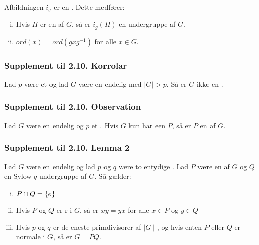 Afbildningen $i_g$ er en . Dette medfører:
\begin{enumerate}[(i)]
  \item Hvis $H$ er en  af $G$, så er $i_g (H)$ en
  undergruppe af $G$.
  \item $ord(x) = ord(gxg^{-1})$ for alle $x \in G$.
\end{enumerate}

\subsubsection{Supplement til 2.10. Korrolar}
Lad $p$ være et  og lad $G$ være en endelig 
med $\mid G\mid> p$. Så er $G$ ikke en .

\subsubsection{Supplement til 2.10. Observation}
Lad $G$ være en endelig  og $p$ et . Hvis $G$
kun har een  $P$, så er $P$ en  af $G$.

\subsubsection{Supplement til 2.10. Lemma 2}
Lad $G$ være en endelig  og lad $p$ og $q$ være to entydige
. Lad $P$ være en  af $G$ og $Q$
en Sylow $q$-undergruppe af $G$. Så gælder:
\begin{enumerate}[(i)]
  \item $P \cap Q = \{ e \}$
  \item Hvis $P$ og $Q$ er r i $G$, så er $xy = yx$
  for alle $x \in P$ og $y \in Q$
  \item Hvis $p$ og $q$ er de eneste primdivisorer af $\mid G\mid$, og hvis
  enten $P$ eller $Q$ er normale i $G$, så er $G = PQ$.
\end{enumerate}